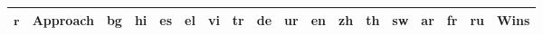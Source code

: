 \begin{table*}[]
\begin{scriptsize}
{\begin{tabular}{c|l|l|l|l|l|l|l|l|l|l|l|l|l|l|l|l|c}
\toprule
\textbf{$\mathbf{r}$} & \multicolumn{1}{c|}{\textbf{Approach}} & \multicolumn{1}{c|}{\textbf{bg}} & \multicolumn{1}{c|}{\textbf{hi}} & \multicolumn{1}{c|}{\textbf{es}} & \multicolumn{1}{c|}{\textbf{el}} & \multicolumn{1}{c|}{\textbf{vi}} & \multicolumn{1}{c|}{\textbf{tr}} & \multicolumn{1}{c|}{\textbf{de}} & \multicolumn{1}{c|}{\textbf{ur}} & \multicolumn{1}{c|}{\textbf{en}} & \multicolumn{1}{c|}{\textbf{zh}} & \multicolumn{1}{c|}{\textbf{th}} & \multicolumn{1}{c|}{\textbf{sw}} & \multicolumn{1}{c|}{\textbf{ar}} & \multicolumn{1}{c|}{\textbf{fr}} & \multicolumn{1}{c|}{\textbf{ru}} & \textbf{Wins} \\ \midrule

\end{tabular}}
\end{scriptsize}
\end{table*}
